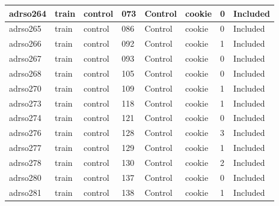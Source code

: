 \begin{center}
\begin{longtable}{|l|l|l|l|l|l|l|l|}
adrso264       & train                 & control           & 073                & Control              & cookie          & 0                & Included      \\ \hline
adrso265       & train                 & control           & 086                & Control              & cookie          & 0                & Included      \\ \hline
adrso266       & train                 & control           & 092                & Control              & cookie          & 1                & Included      \\ \hline
adrso267       & train                 & control           & 093                & Control              & cookie          & 0                & Included      \\ \hline
adrso268       & train                 & control           & 105                & Control              & cookie          & 0                & Included      \\ \hline
adrso270       & train                 & control           & 109                & Control              & cookie          & 1                & Included      \\ \hline
adrso273       & train                 & control           & 118                & Control              & cookie          & 1                & Included      \\ \hline
adrso274       & train                 & control           & 121                & Control              & cookie          & 0                & Included      \\ \hline
adrso276       & train                 & control           & 128                & Control              & cookie          & 3                & Included      \\ \hline
adrso277       & train                 & control           & 129                & Control              & cookie          & 1                & Included      \\ \hline
adrso278       & train                 & control           & 130                & Control              & cookie          & 2                & Included      \\ \hline
adrso280       & train                 & control           & 137                & Control              & cookie          & 0                & Included      \\ \hline
adrso281       & train                 & control           & 138                & Control              & cookie          & 1                & Included      \\ \hline

\end{longtable}
\end{center}
